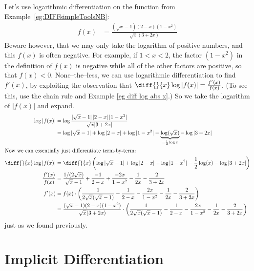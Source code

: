 \begin{eg}\label{eg_2_10_4}
Let's use logarithmic differentiation on the function from
Example~\ref{eg:DIFFsimpleToolsNB}:
\begin{align*}
f(x) &=\frac{(\sqrt{x}-1)(2-x)(1-x^2)}{\sqrt{x}(3+2x)}
\end{align*}
Beware however, that we may only take the logarithm of positive numbers,
and this $f(x)$ is often negative. For example, if $1<x<2$, the factor
$(1-x^2)$ in the definition of $f(x)$ is negative while all of the other factors are positive, so that $f(x)<0$. None--the--less, we can use logarithmic
differentiation to find $f'(x)$,  by exploiting the observation that
$\diff{}{x}\log|f(x)|=\frac{f'(x)}{f(x)}$. (To see this, use the chain rule and
Example \ref{eg diff log abs x}.) So we take the logarithm of $|f(x)|$ and expand.
\begin{align*}
\log |f(x)| &= \log \frac{|\sqrt{x}-1|\,|2-x|\,|1-x^2|}{\sqrt{x}|3+2x|} \\
  &= \log|\sqrt{x}-1| + \log|2-x| + \log|1-x^2| -
\underbrace{\log(\sqrt{x})}_{=\frac{1}{2}\log x} - \log|3+2x| \\
\intertext{Now we can essentially just differentiate term-by-term:}
\diff{}{x}\log |f(x)| &= \diff{}{x} \left(
  \log|\sqrt{x}-1| + \log|2-x| + \log|1-x^2| - \frac{1}{2}\log(x) - \log|3+2x|
 \right)\\
\frac{f'(x)}{f(x)} &= \frac{1/(2\sqrt{x})}{\sqrt{x}-1}
  + \frac{-1}{2-x} + \frac{-2x}{1-x^2} - \frac{1}{2x} - \frac{2}{3+2x} \\
f'(x) &= f(x) \cdot \left( \frac{1}{2 \sqrt{x} (\sqrt{x}-1)}
  - \frac{1}{2-x} - \frac{2x}{1-x^2} - \frac{1}{2x} - \frac{2}{3+2x}
\right)\\
  &= \frac{(\sqrt{x}-1)(2-x)(1-x^2)}{\sqrt{x}(3+2x)}
  \cdot \left( \frac{1}{2 \sqrt{x} (\sqrt{x}-1)}
  - \frac{1}{2-x} - \frac{2x}{1-x^2} - \frac{1}{2x} - \frac{2}{3+2x}
\right)
\end{align*}
just as we found previously.
\end{eg}


\section{Implicit Differentiation}\label{sec_2_11}


